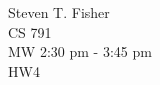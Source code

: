 \documentclass{article}
\newcommand{\src}[1]{}
\begin{document}
	\begin{flushright}
		Steven T. Fisher\\
		CS 791\\
		MW 2:30 pm - 3:45 pm\\
		HW4
	\end{flushright}
\renewcommand\qedsymbol{}
\src{h4q1}
\newpage
\src{h4q2}
\newpage
\src{h4q3}
\newpage
\src{h4q4}
\end{document}
